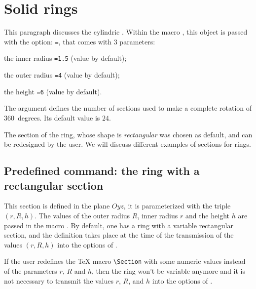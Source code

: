 
\section{Solid rings}

This paragraph discusses the cylindric . Within the macro
, this object is passed with the option:
\texttt{=}, that comes with 3 parameters:
\begin{compactitem}
  \item the inner radius \texttt{=1.5} (value by default);
  \item the outer radius \texttt{=4} (value by default);
  \item the height \texttt{=6} (value by default).
\end{compactitem}

The argument  defines the number of sections used to make a complete
rotation of $360$~degrees. Its default value is $24$.

The section of the ring, whose shape is \textit{rectangular} was chosen as default,
and can be redesigned by the user.
We will discuss different examples of sections for rings.

\subsection{Predefined command: the ring with a rectangular section}

This section is defined in the plane $Oyz$, it is parameterized with the
triple $(r, R, h)$. The values of the outer radius $R$, inner radius $r$ and the
height $h$ are passed in the macro . By default, one has a ring with
a variable rectangular section, and the definition takes place at the time
of the transmission of the values $(r, R, h)$ into the options of .

If the user redefines the \TeX {} macro \verb+\Section+ with some numeric values
instead of the  parameters $r$, $R$ and $h$, then
the ring won't be variable anymore  and it is not necessary to transmit the
values  $r$, $R$, and $h$ into the options of .

